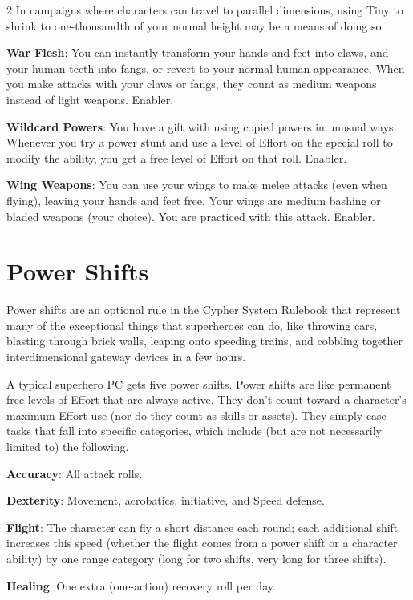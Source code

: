 \begin{multicols}{2}
In campaigns where characters can travel to parallel dimensions, using Tiny to shrink to one-thousandth of your normal height may be a means of doing so.

\textbf{War Flesh}: You can instantly transform your hands and feet into claws, and your human teeth into fangs, or revert to your normal human appearance. When you make attacks with your claws or fangs, they count as medium weapons instead of light weapons. Enabler.

\textbf{Wildcard Powers}: You have a gift with using copied powers in unusual ways. Whenever you try a power stunt and use a level of Effort on the special roll to modify the ability, you get a free level of Effort on that roll. Enabler.

\textbf{Wing Weapons}: You can use your wings to make melee attacks (even when flying), leaving your hands and feet free. Your wings are medium bashing or bladed weapons (your choice). You are practiced with this attack. Enabler.

\section{Power Shifts}

Power shifts are an optional rule in the Cypher System Rulebook that represent many of the exceptional things that superheroes can do, like throwing cars, blasting through brick walls, leaping onto speeding trains, and cobbling together interdimensional gateway devices in a few hours.

A typical superhero PC gets five power shifts. Power shifts are like permanent free levels of Effort that are always active. They don’t count toward a character’s maximum Effort use (nor do they count as skills or assets). They simply ease tasks that fall into specific categories, which include (but are not necessarily limited to) the following.

\textbf{Accuracy}: All attack rolls.

\textbf{Dexterity}: Movement, acrobatics, initiative, and Speed defense.

\textbf{Flight}: The character can fly a short distance each round; each additional shift increases this speed (whether the flight comes from a power shift or a character ability) by one range category (long for two shifts, very long for three shifts).

\textbf{Healing}: One extra (one-action) recovery roll per day.


\end{multicols}
